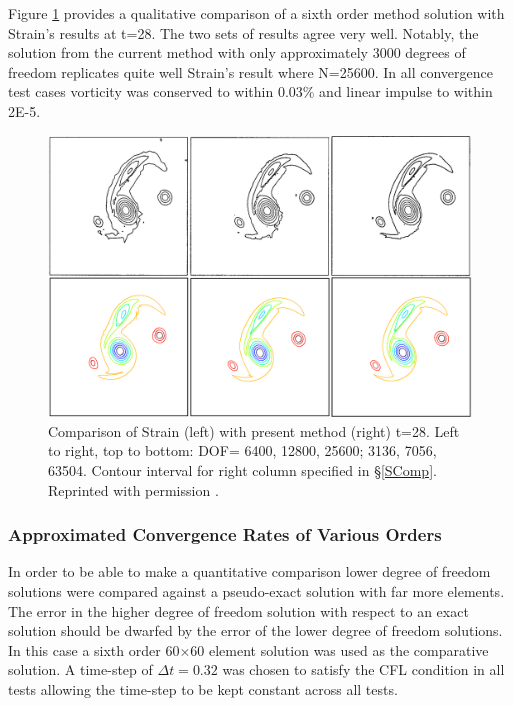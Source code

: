 \documentclass[]{aiaa-tc}%
\begin{document}
Figure \ref{fig:StrainComp} provides a qualitative comparison of a sixth order method solution with Strain's results at t=28. The two sets of results agree very well. Notably, the solution from the current method with only approximately 3000 degrees of freedom replicates quite well Strain's result where N=25600. In all convergence test cases vorticity was conserved to within 0.03\% and linear impulse to within 2E-5.
\begin{figure}[t]
\centering
\includegraphics[width=1\textwidth]{StrainCompRmod.PNG}
\caption{\label{fig:StrainComp}Comparison of Strain \cite{Strain1996} (left) with present method (right) t=28. Left to right, top to bottom: DOF= 6400, 12800, 25600; 3136, 7056, 63504. Contour interval for right column specified in \S\ref{SComp}. Reprinted with permission \cite{StrainLic}. }
\end{figure}

\subsubsection{Approximated Convergence Rates of Various Orders}\label{SConverge}
In order to be able to make a quantitative comparison lower degree of freedom solutions were compared against a pseudo-exact solution with far more elements. The error in the higher degree of freedom solution with respect to an exact solution should be dwarfed by the error of the lower degree of freedom solutions. In this case a sixth order 60$\times$60 element solution was used as the comparative solution. A time-step of $\Delta t=0.32$ was chosen to satisfy the CFL condition in all tests allowing the time-step to be kept constant across all tests.
\end{document}

